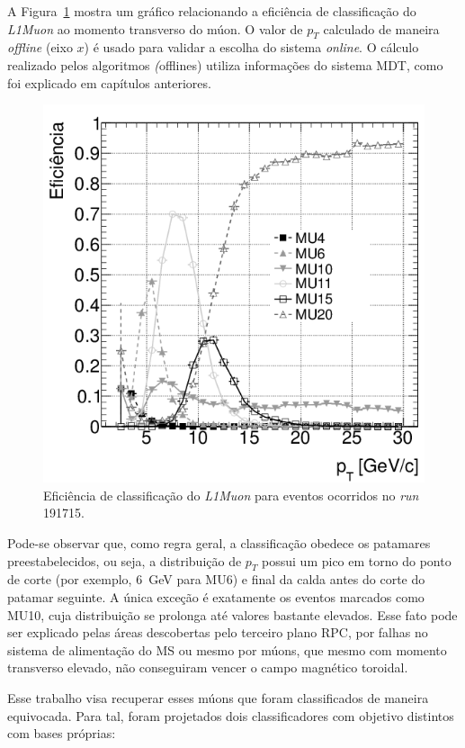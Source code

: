 A Figura~\ref{fig:muonrates} mostra um gráfico relacionando a eficiência de
classificação do \emph{L1Muon} ao momento transverso do múon. O valor de $p_T$
calculado de maneira \emph{offline} (eixo $x$) é usado para validar a escolha
do sistema \emph{online}. O cálculo realizado pelos algoritmos \emph(offlines)
utiliza informações do sistema MDT, como foi explicado em capítulos anteriores.

\begin{figure}[ht!]
    \centering
    \includegraphics[width=12cm]{images/ppm_rpc_turnon_mu10.png}
    \caption{Eficiência de classificação do \emph{L1Muon} para eventos
    ocorridos no \emph{run} 191715.}
    \label{fig:muonrates}
\end{figure}

Pode-se observar que, como regra geral, a classificação obedece os patamares
preestabelecidos, ou seja, a distribuição de $p_T$ possui um pico em torno do
ponto de corte (por exemplo, 6~GeV para MU6) e final da calda antes do corte do
patamar seguinte. A única exceção é exatamente os eventos marcados como MU10,
cuja distribuição se prolonga até valores bastante elevados. Esse fato pode ser
explicado pelas áreas descobertas pelo terceiro plano RPC, por falhas no sistema
de alimentação do MS ou mesmo por múons, que mesmo com momento transverso
elevado, não conseguiram vencer o campo magnético toroidal.

Esse trabalho visa recuperar esses múons que foram classificados de maneira
equivocada. Para tal, foram projetados dois classificadores com objetivo
distintos com bases próprias:

